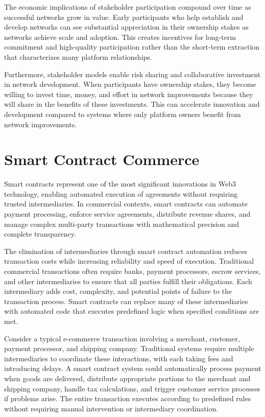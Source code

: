 \documentclass[
  Letterpaper,
]{scrbook}
\begin{document}
The economic implications of stakeholder participation compound over
time as successful networks grow in value. Early participants who help
establish and develop networks can see substantial appreciation in their
ownership stakes as networks achieve scale and adoption. This creates
incentives for long-term commitment and high-quality participation
rather than the short-term extraction that characterizes many platform
relationships.

Furthermore, stakeholder models enable risk sharing and collaborative
investment in network development. When participants have ownership
stakes, they become willing to invest time, money, and effort in network
improvements because they will share in the benefits of these
investments. This can accelerate innovation and development compared to
systems where only platform owners benefit from network improvements.

\section{Smart Contract Commerce}\label{smart-contract-commerce}

Smart contracts represent one of the most significant innovations in
Web3 technology, enabling automated execution of agreements without
requiring trusted intermediaries. In commercial contexts, smart
contracts can automate payment processing, enforce service agreements,
distribute revenue shares, and manage complex multi-party transactions
with mathematical precision and complete transparency.

The elimination of intermediaries through smart contract automation
reduces transaction costs while increasing reliability and speed of
execution. Traditional commercial transactions often require banks,
payment processors, escrow services, and other intermediaries to ensure
that all parties fulfill their obligations. Each intermediary adds cost,
complexity, and potential points of failure to the transaction process.
Smart contracts can replace many of these intermediaries with automated
code that executes predefined logic when specified conditions are met.

Consider a typical e-commerce transaction involving a merchant,
customer, payment processor, and shipping company. Traditional systems
require multiple intermediaries to coordinate these interactions, with
each taking fees and introducing delays. A smart contract system could
automatically process payment when goods are delivered, distribute
appropriate portions to the merchant and shipping company, handle tax
calculations, and trigger customer service processes if problems arise.
The entire transaction executes according to predefined rules without
requiring manual intervention or intermediary coordination.
\end{document}
